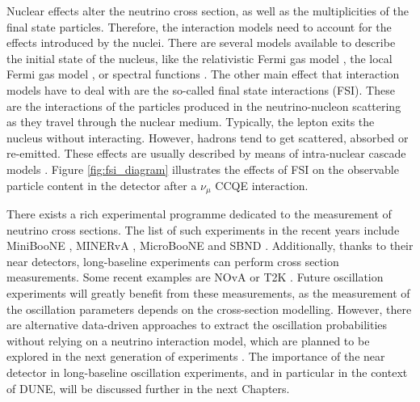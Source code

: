 Nuclear effects alter the neutrino cross section, as well as the multiplicities of the final state particles. Therefore, the interaction models need to account for the effects introduced by the nuclei. There are several models available to describe the initial state of the nucleus, like the relativistic Fermi gas model \cite{Smith1972}, the local Fermi gas model \cite{Chiang1989}, or spectral functions \cite{Nakamura2002}. The other main effect that interaction models have to deal with are the so-called final state interactions (FSI). These are the interactions of the particles produced in the neutrino-nucleon scattering as they travel through the nuclear medium. Typically, the lepton exits the nucleus without interacting. However, hadrons tend to get scattered, absorbed or re-emitted. These effects are usually described by means of intra-nuclear cascade models \cite{Nikolakopoulos2022}. Figure \ref{fig:fsi_diagram} illustrates the effects of FSI on the observable particle content in the detector after a $\nu_{\mu}$ CCQE interaction.

There exists a rich experimental programme dedicated to the measurement of neutrino cross sections. The list of such experiments in the recent years include MiniBooNE \cite{MiniBooNE2010}, MINERvA \cite{MINERvA2016}, MicroBooNE \cite{MicroBooNE2021} and SBND \cite{McConkey2018}. Additionally, thanks to their near detectors, long-baseline experiments can perform cross section measurements. Some recent examples are NOvA \cite{Nova2021} or T2K \cite{T2K2019}. Future oscillation experiments will greatly benefit from these measurements, as the measurement of the oscillation parameters depends on the cross-section modelling. However, there are alternative data-driven approaches to extract the oscillation probabilities without relying on a neutrino interaction model, which are planned to be explored in the next generation of experiments \cite{Scott2015,Hasnip2023}. The importance of the near detector in long-baseline oscillation experiments, and in particular in the context of DUNE, will be discussed further in the next Chapters.